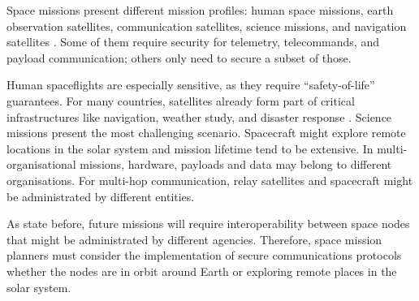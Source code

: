  


 
 
Space missions present different mission profiles: human space missions, earth observation satellites, communication satellites, science missions, and navigation satellites \cite{book2012architecture}. Some of them require security for telemetry, telecommands, and payload communication; others only need to secure a subset of those. 


Human spaceflights are especially sensitive, as they require ``safety-of-life'' guarantees. For many countries, satellites already form part of critical infrastructures like navigation, weather study, and disaster response \cite{book2006security}. Science missions present the most challenging scenario. Spacecraft might explore remote locations in the solar system and mission lifetime tend to be extensive. In multi-organisational missions, hardware, payloads and data may belong to different organisations. For multi-hop communication, relay satellites and spacecraft might be administrated by different entities.


As state before, future missions will require interoperability between space nodes that might be administrated by different agencies. Therefore, space mission planners must consider the implementation of secure communications protocols whether the nodes are in orbit around Earth or exploring remote places in the solar system.


 
 

